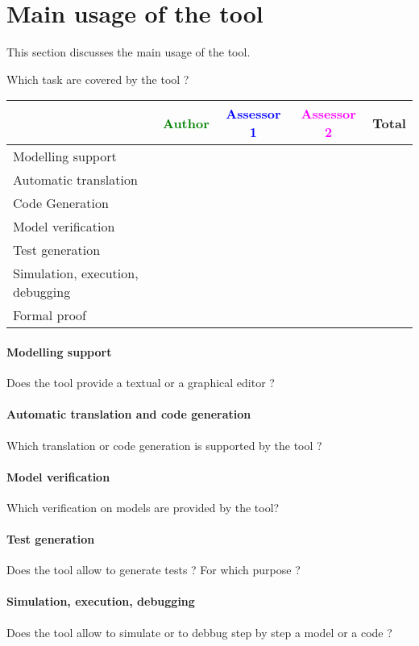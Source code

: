 \section{Main usage of the tool}
\label{main_usage}

This section discusses the main usage of the tool.

Which task are covered by the tool ?


\begin{tabular}{|l | c | c | c | c|}
\hline
& \textcolor{green}{Author} & \textcolor{blue}{Assessor 1} & \textcolor{magenta}{Assessor 2} & Total \\
\hline 
Modelling support & & & &  \\
\hline
Automatic translation  & & & & \\
\hline
Code Generation  & & & & \\
\hline
Model verification & & & & \\
\hline
Test generation & & & & \\
\hline
Simulation, execution, debugging & & & & \\
\hline
Formal proof & & & & \\
\hline
\end{tabular}

\paragraph{Modelling support}
Does the tool provide a  textual or a graphical editor ?

\paragraph{Automatic translation and code generation}
Which translation or code generation is supported by the tool ?

\paragraph{Model verification}
Which verification on models are provided by the tool?

\paragraph{Test generation}
Does the tool allow to generate tests ? For  which purpose ?

\paragraph{Simulation, execution, debugging}
Does the tool allow to simulate or to debbug step by step a model or a code ?

